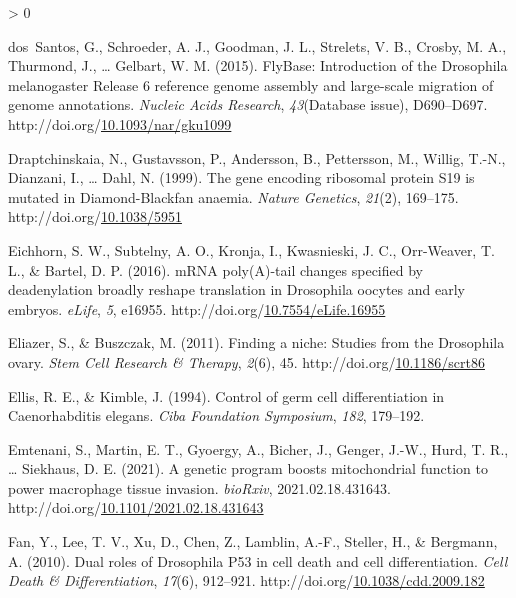 \documentclass[12pt,oneside]{reedthesis}
\newlength{\cslhangindent}
\newenvironment{CSLReferences}[2] %
 {%
  \setlength{\parindent}{0pt}
  \ifodd #1 \everypar{\setlength{\hangindent}{\cslhangindent}}\ignorespaces\fi
  \ifnum #2 > 0
  \setlength{\parskip}{#2\baselineskip}
  \fi
 }%
 {}
\begin{document}
\begin{CSLReferences}{1}{0}
\leavevmode\hypertarget{ref-dossantosFlyBaseIntroductionDrosophila2015}{}%
dos~Santos, G., Schroeder, A. J., Goodman, J. L., Strelets, V. B., Crosby, M. A., Thurmond, J., \ldots{} Gelbart, W. M. (2015). {FlyBase}: Introduction of the {Drosophila} melanogaster {Release} 6 reference genome assembly and large-scale migration of genome annotations. \emph{Nucleic Acids Research}, \emph{43}(Database issue), D690--D697. http://doi.org/\href{https://doi.org/10.1093/nar/gku1099}{10.1093/nar/gku1099}

\leavevmode\hypertarget{ref-draptchinskaiaGeneEncodingRibosomal1999}{}%
Draptchinskaia, N., Gustavsson, P., Andersson, B., Pettersson, M., Willig, T.-N., Dianzani, I., \ldots{} Dahl, N. (1999). The gene encoding ribosomal protein {S19} is mutated in {Diamond-Blackfan} anaemia. \emph{Nature Genetics}, \emph{21}(2), 169--175. http://doi.org/\href{https://doi.org/10.1038/5951}{10.1038/5951}

\leavevmode\hypertarget{ref-Eichhorn2016n}{}%
Eichhorn, S. W., Subtelny, A. O., Kronja, I., Kwasnieski, J. C., Orr-Weaver, T. L., \& Bartel, D. P. (2016). {mRNA} poly({A})-tail changes specified by deadenylation broadly reshape translation in {Drosophila} oocytes and early embryos. \emph{eLife}, \emph{5}, e16955. http://doi.org/\href{https://doi.org/10.7554/eLife.16955}{10.7554/eLife.16955}

\leavevmode\hypertarget{ref-eliazerFindingNicheStudies2011}{}%
Eliazer, S., \& Buszczak, M. (2011). Finding a niche: Studies from the {Drosophila} ovary. \emph{Stem Cell Research \& Therapy}, \emph{2}(6), 45. http://doi.org/\href{https://doi.org/10.1186/scrt86}{10.1186/scrt86}

\leavevmode\hypertarget{ref-Ellis1994d}{}%
Ellis, R. E., \& Kimble, J. (1994). Control of germ cell differentiation in {Caenorhabditis} elegans. \emph{Ciba Foundation Symposium}, \emph{182}, 179--192.

\leavevmode\hypertarget{ref-emtenaniGeneticProgramBoosts2021}{}%
Emtenani, S., Martin, E. T., Gyoergy, A., Bicher, J., Genger, J.-W., Hurd, T. R., \ldots{} Siekhaus, D. E. (2021). A genetic program boosts mitochondrial function to power macrophage tissue invasion. \emph{bioRxiv}, 2021.02.18.431643. http://doi.org/\href{https://doi.org/10.1101/2021.02.18.431643}{10.1101/2021.02.18.431643}

\leavevmode\hypertarget{ref-fanDualRolesDrosophila2010}{}%
Fan, Y., Lee, T. V., Xu, D., Chen, Z., Lamblin, A.-F., Steller, H., \& Bergmann, A. (2010). Dual roles of {Drosophila} P53 in cell death and cell differentiation. \emph{Cell Death \& Differentiation}, \emph{17}(6), 912--921. http://doi.org/\href{https://doi.org/10.1038/cdd.2009.182}{10.1038/cdd.2009.182}


\end{CSLReferences}
\end{document}
